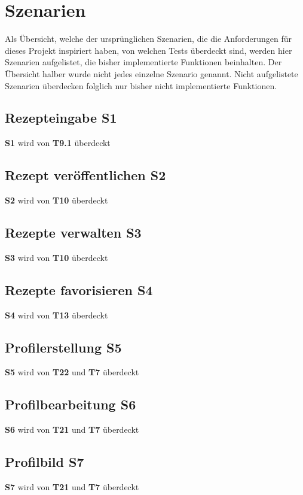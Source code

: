 \chapter{Szenarien}
Als Übersicht, welche der ursprünglichen Szenarien, die die Anforderungen für dieses Projekt inspiriert haben, von welchen Tests überdeckt sind, werden hier Szenarien aufgelistet, die bisher implementierte Funktionen beinhalten. Der Übersicht halber wurde nicht jedes einzelne Szenario genannt. Nicht aufgelistete Szenarien überdecken folglich nur bisher nicht implementierte Funktionen.

\section{Rezepteingabe \textbf{S1}}
\textbf{S1} wird von \textbf{T9.1} überdeckt

\section{Rezept veröffentlichen \textbf{S2}}
\textbf{S2} wird von \textbf{T10} überdeckt

\section{Rezepte verwalten \textbf{S3}}
\textbf{S3} wird von \textbf{T10} überdeckt

\section{Rezepte favorisieren \textbf{S4}}
\textbf{S4} wird von \textbf{T13} überdeckt

\section{Profilerstellung \textbf{S5}}
\textbf{S5} wird von \textbf{T22} und \textbf{T7} überdeckt

\section{Profilbearbeitung \textbf{S6}}
\textbf{S6} wird von \textbf{T21} und \textbf{T7} überdeckt

\section{Profilbild \textbf{S7}}
\textbf{S7} wird von \textbf{T21} und \textbf{T7} überdeckt

